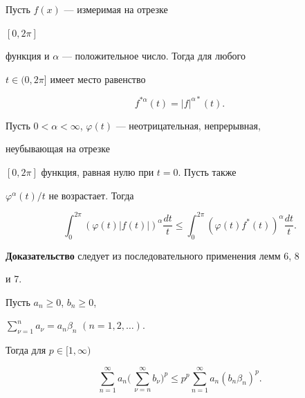 \begin{lem} Пусть $f(x)$ --- измеримая на отрезке


$[0,2\pi]$


функция и $\alpha$ --- положительное число. Тогда для любого


$t\in(0,2\pi]$ имеет место равенство


$$


f^{*\alpha}(t)=|f|^{\alpha *}(t).


$$


\end{lem}





\begin{lem}


Пусть $0<\alpha<\infty$, $\varphi(t)$ --- неотрицательная, непрерывная,


неубывающая на отрезке


$[0,2\pi]$ функция, равная нулю при $t=0$. Пусть также


$\varphi^\alpha(t)/t$ не возрастает. Тогда


$$


\int^{2\pi}_0(\varphi(t)|f(t)|)^\alpha\frac{dt}{t}\le


\int^{2\pi}_0(\varphi(t)f^*(t))^\alpha\frac{dt}{t}.


$$


\end{lem}





{\bf Доказательство} следует из последовательного применения лемм 6, 8


и 7.





\begin{lem} Пусть $a_n\ge 0$, $b_n\ge 0$,


$\sum\limits^n_{\nu=1}a_\nu=a_n\beta_n$ $(n=1,2,\dotsc)$.


Тогда для $p\in[1,\infty)$


$$


\sum^\infty_{n=1}a_n\biggl(\,\sum^\infty_{\nu=n}b_\nu\biggr)^p


\le p^p\sum^\infty_{n=1}a_n(b_n\beta_n)^p.


$$


\end{lem}





